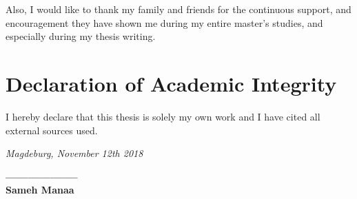 Also, I would like to thank my family and friends for the continuous support, and encouragement they have shown me during my entire master's studies, and especially during my thesis writing.





{\chapter*{Declaration of Academic Integrity}}

I hereby declare that this thesis is solely my own work and I have cited all external sources used.

\textit{Magdeburg, November 12th 2018} 



\begin{flushright}
\textbf{——————–} \\
\textbf{Sameh Manaa}
\end{flushright}
